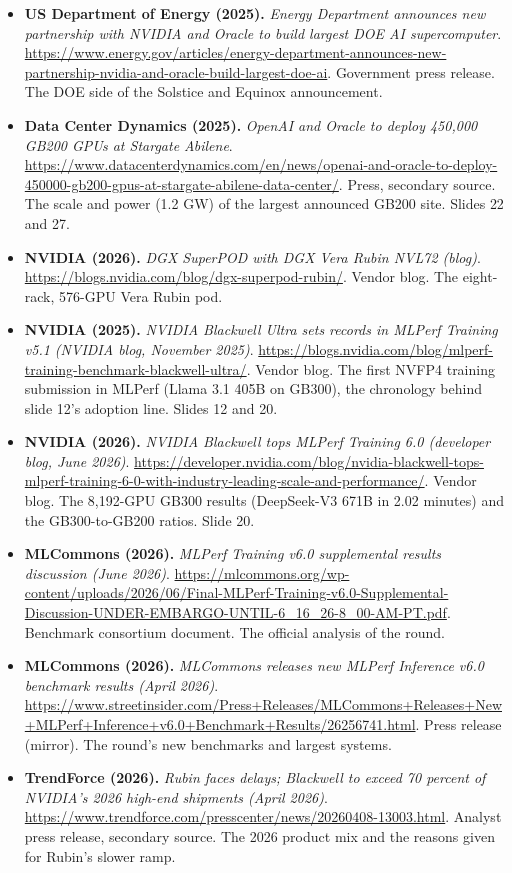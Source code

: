 \documentclass[11pt,letterpaper]{article}
\begin{document}
\begin{itemize}[leftmargin=1.2em,itemsep=3pt]
\item \textbf{US Department of Energy (2025).} \textit{Energy Department announces new partnership with NVIDIA and Oracle to build largest DOE AI supercomputer}. \url{https://www.energy.gov/articles/energy-department-announces-new-partnership-nvidia-and-oracle-build-largest-doe-ai}. Government press release. The DOE side of the Solstice and Equinox announcement.
\item \textbf{Data Center Dynamics (2025).} \textit{OpenAI and Oracle to deploy 450,000 GB200 GPUs at Stargate Abilene}. \url{https://www.datacenterdynamics.com/en/news/openai-and-oracle-to-deploy-450000-gb200-gpus-at-stargate-abilene-data-center/}. Press, secondary source. The scale and power (1.2 GW) of the largest announced GB200 site. Slides 22 and 27.
\item \textbf{NVIDIA (2026).} \textit{DGX SuperPOD with DGX Vera Rubin NVL72 (blog)}. \url{https://blogs.nvidia.com/blog/dgx-superpod-rubin/}. Vendor blog. The eight-rack, 576-GPU Vera Rubin pod.
\item \textbf{NVIDIA (2025).} \textit{NVIDIA Blackwell Ultra sets records in MLPerf Training v5.1 (NVIDIA blog, November 2025)}. \url{https://blogs.nvidia.com/blog/mlperf-training-benchmark-blackwell-ultra/}. Vendor blog. The first NVFP4 training submission in MLPerf (Llama 3.1 405B on GB300), the chronology behind slide 12's adoption line. Slides 12 and 20.
\item \textbf{NVIDIA (2026).} \textit{NVIDIA Blackwell tops MLPerf Training 6.0 (developer blog, June 2026)}. \url{https://developer.nvidia.com/blog/nvidia-blackwell-tops-mlperf-training-6-0-with-industry-leading-scale-and-performance/}. Vendor blog. The 8,192-GPU GB300 results (DeepSeek-V3 671B in 2.02 minutes) and the GB300-to-GB200 ratios. Slide 20.
\item \textbf{MLCommons (2026).} \textit{MLPerf Training v6.0 supplemental results discussion (June 2026)}. \url{https://mlcommons.org/wp-content/uploads/2026/06/Final-MLPerf-Training-v6.0-Supplemental-Discussion-UNDER-EMBARGO-UNTIL-6_16_26-8_00-AM-PT.pdf}. Benchmark consortium document. The official analysis of the round.
\item \textbf{MLCommons (2026).} \textit{MLCommons releases new MLPerf Inference v6.0 benchmark results (April 2026)}. \url{https://www.streetinsider.com/Press+Releases/MLCommons+Releases+New+MLPerf+Inference+v6.0+Benchmark+Results/26256741.html}. Press release (mirror). The round's new benchmarks and largest systems.
\item \textbf{TrendForce (2026).} \textit{Rubin faces delays; Blackwell to exceed 70 percent of NVIDIA's 2026 high-end shipments (April 2026)}. \url{https://www.trendforce.com/presscenter/news/20260408-13003.html}. Analyst press release, secondary source. The 2026 product mix and the reasons given for Rubin's slower ramp.
\end{itemize}
\end{document}
